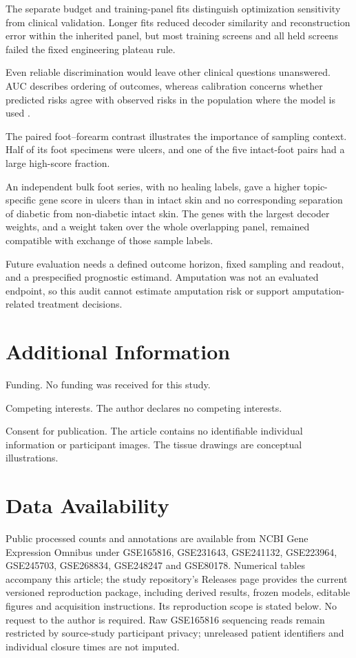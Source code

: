 \documentclass[10pt,a4paper]{article}
\begin{document}
The separate budget and training-panel fits distinguish optimization sensitivity from clinical validation. Longer fits reduced decoder similarity and reconstruction error within the inherited panel, but most training screens and all held screens failed the fixed engineering plateau rule.

Even reliable discrimination would leave other clinical questions unanswered. AUC describes ordering of outcomes, whereas calibration concerns whether predicted risks agree with observed risks in the population where the model is used \citep{steyerberg2010,vancalster2019}.

The paired foot--forearm contrast illustrates the importance of sampling context. Half of its foot specimens were ulcers, and one of the five intact-foot pairs had a large high-score fraction.

An independent bulk foot series, with no healing labels, gave a higher topic-specific gene score in ulcers than in intact skin and no corresponding separation of diabetic from non-diabetic intact skin. The genes with the largest decoder weights, and a weight taken over the whole overlapping panel, remained compatible with exchange of those sample labels.

Future evaluation needs a defined outcome horizon, fixed sampling and readout, and a prespecified prognostic estimand. Amputation was not an evaluated endpoint, so this audit cannot estimate amputation risk or support amputation-related treatment decisions.

\section*{Additional Information}
Funding. No funding was received for this study.

Competing interests. The author declares no competing interests.





Consent for publication. The article contains no identifiable individual information or participant images. The tissue drawings are conceptual illustrations.

\section*{Data Availability}
Public processed counts and annotations are available from NCBI Gene Expression Omnibus under GSE165816, GSE231643, GSE241132, GSE223964, GSE245703, GSE268834, GSE248247 and GSE80178. Numerical tables accompany this article; the study repository's Releases page provides the current versioned reproduction package, including derived results, frozen models, editable figures and acquisition instructions. Its reproduction scope is stated below. No request to the author is required. Raw GSE165816 sequencing reads remain restricted by source-study participant privacy; unreleased patient identifiers and individual closure times are not imputed.
\end{document}
